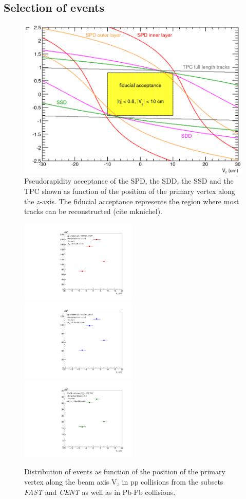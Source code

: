 \documentclass[12pt,a4paper]{report}
\begin{document}
\subsection{Selection of events}
\begin{figure}[tb!]
\centering
\includegraphics[width=12cm]{Plots/fiducialAcc.png}  
\caption{Pseudorapidity acceptance of the SPD, the SDD, the SSD and the TPC shown as function of the position of the primary vertex along the $z$-axis. The fiducial acceptance represents the region where most tracks can be reconstructed (cite mknichel).}
\label{fiducialAcc}
\end{figure}
\begin{figure}[tb!]
\centering
\includegraphics[width=0.495\textwidth]{Plots/VzFAST.pdf}  
\includegraphics[width=0.495\textwidth]{Plots/VzCENTwSDD.pdf}  
\includegraphics[width=0.495\textwidth]{Plots/VzPbPb.pdf}  
\caption{Distribution of events as function of the position of the primary vertex along the beam axis $\text{V}_z$ in pp collisions from the subsets \textit{FAST} and \textit{CENT} as well as in Pb-Pb collisions.}
\label{Vzplots}
\end{figure}
\end{document}

